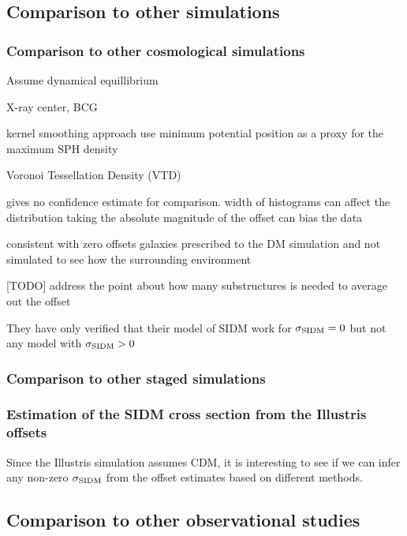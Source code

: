 \subsection{Comparison to other simulations}
\subsubsection{Comparison to other cosmological simulations}



Assume dynamical equillibrium 


\cite{Cui2015} X-ray center, BCG

kernel smoothing approach
use minimum potential position as a proxy for the maximum SPH density 

Voronoi Tessellation Density (VTD)



gives no confidence estimate for comparison. 
width of histograms can affect the distribution  
taking the absolute magnitude of the offset can bias the data  

\cite{Harvey2013d} consistent with zero offsets 
galaxies prescribed to the DM simulation and not simulated to see 
how the surrounding environment 

[TODO] address the point about how many substructures is needed to average out
the offset 


They have only verified that their model of SIDM work for 
$\sigma_{\rm SIDM} = 0$ but not any model with $\sigma_{\rm SIDM} > 0$

\subsubsection{Comparison to other staged simulations}
\cite{Robertson2016}


\subsubsection{Estimation of the SIDM cross section from the Illustris offsets}
Since the Illustris simulation assumes CDM, it is interesting to see if we can
infer any non-zero $\sigma_{\rm SIDM}$ from the offset estimates based on
different methods.  




\subsection{Comparison to other observational studies}

